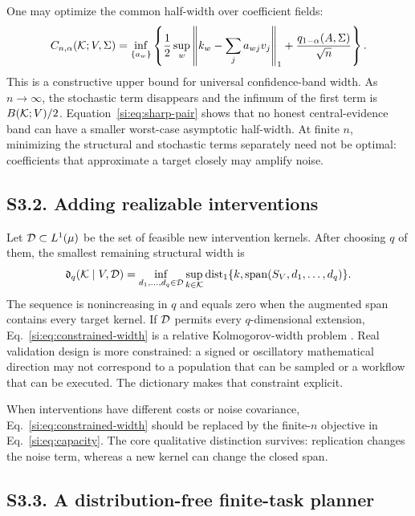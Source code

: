 One may optimize the common half-width over coefficient fields:
\begin{equation}
C_{n,\alpha}(\mathcal K;V,\Sigma)
=\inf_{\{a_w\}}
\left\{
\frac12\sup_w\left\|k_w-\sum_ja_{wj}v_j\right\|_1
+\frac{q_{1-\alpha}(A,\Sigma)}{\sqrt n}
\right\}.
\label{si:eq:capacity}
\end{equation}
This is a constructive upper bound for universal confidence-band width. As $n\to\infty$, the stochastic term disappears and the infimum of the first term is $B(\mathcal K;V)/2$. Equation~\ref{si:eq:sharp-pair} shows that no honest central-evidence band can have a smaller worst-case asymptotic half-width. At finite $n$, minimizing the structural and stochastic terms separately need not be optimal: coefficients that approximate a target closely may amplify noise.

\subsection*{S3.2. Adding realizable interventions}

Let $\mathcal D\subset L^1(\mu)$ be the set of feasible new intervention kernels. After choosing $q$ of them, the smallest remaining structural width is
\begin{equation}
\mathfrak d_q(\mathcal K\mid V,\mathcal D)
=\inf_{d_1,\ldots,d_q\in\mathcal D}
\sup_{k\in\mathcal K}\operatorname{dist}_1\{k,\operatorname{span}(S_V,d_1,\ldots,d_q)\}.
\label{si:eq:constrained-width}
\end{equation}
The sequence is nonincreasing in $q$ and equals zero when the augmented span contains every target kernel. If $\mathcal D$ permits every $q$-dimensional extension, Eq.~\ref{si:eq:constrained-width} is a relative Kolmogorov-width problem \citep{pinkus1985}. Real validation design is more constrained: a signed or oscillatory mathematical direction may not correspond to a population that can be sampled or a workflow that can be executed. The dictionary makes that constraint explicit.

When interventions have different costs or noise covariance, Eq.~\ref{si:eq:constrained-width} should be replaced by the finite-$n$ objective in Eq.~\ref{si:eq:capacity}. The core qualitative distinction survives: replication changes the noise term, whereas a new kernel can change the closed span.

\subsection*{S3.3. A distribution-free finite-task planner}

